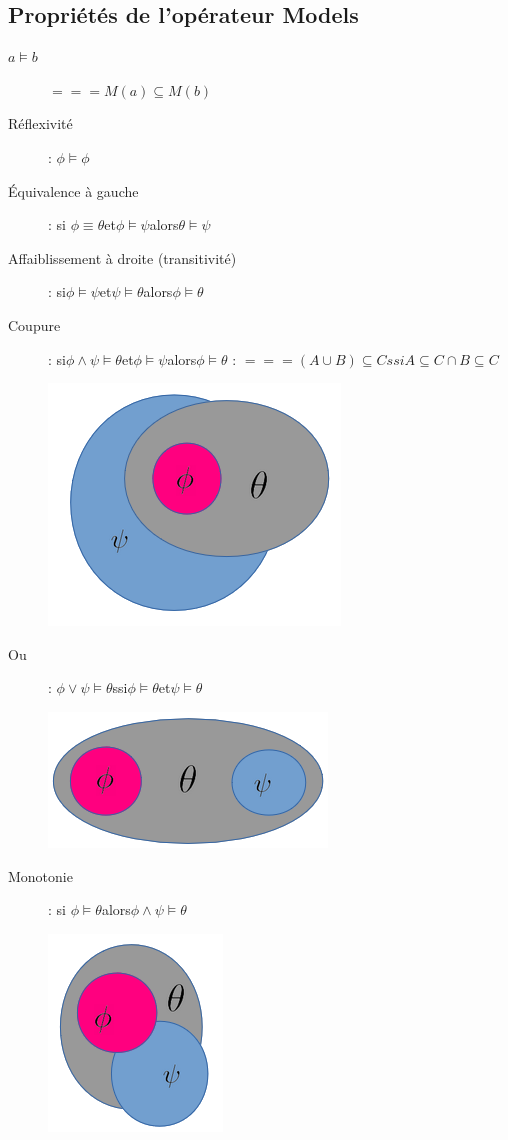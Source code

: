 \subsection{Propriétés de l'opérateur Models}

\begin{description}
\item[$a \models b$] $=== M(a) \subseteq M(b)$
\item[Réflexivité]: $\phi \models \phi$
\item[Équivalence à gauche]: si $\phi \equiv \theta $et$ \phi \models \psi $alors$ \theta \models \psi$
\item[Affaiblissement à droite (transitivité)]: si$ \phi \models \psi $et$ \psi \models \theta $alors$ \phi \models \theta$
\item[Coupure]: si$ \phi \wedge \psi \models \theta $et$ \phi \models \psi $alors$ \phi \models \theta$ : $=== (A \cup B) \subseteq C ssi A \subseteq C \cap B \subseteq C$
\item[] \includegraphics[scale=0.3]{img/of-coupure.png} 
\item[Ou]: $\phi \vee \psi \models \theta $ssi$ \phi \models \theta $et$ \psi \models \theta$
\item[] \includegraphics[scale=0.3]{img/of-ou.png}
\item[Monotonie]: si $\phi \models \theta $alors$ \phi \wedge \psi \models \theta$
\item[] \includegraphics[scale=0.3]{img/of-monotomie.png}
\end{description}

